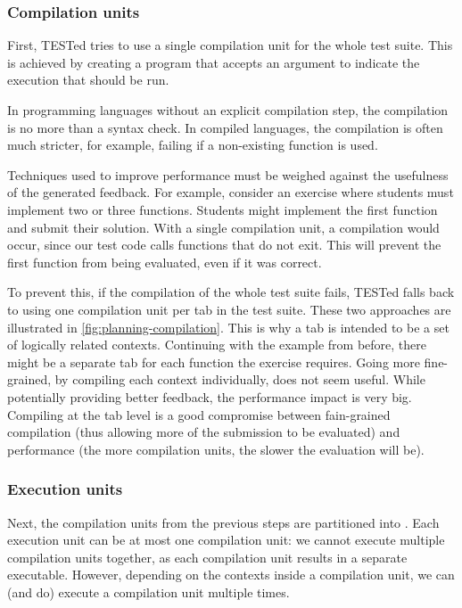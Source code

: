 \documentclass[../main]{subfiles}
\begin{document}
\subsubsection{Compilation units}
\label{subsubsec:compilation-units}

First, TESTed tries to use a single compilation unit for the whole test suite.
This is achieved by creating a program that accepts an argument to indicate the execution that should be run.

In programming languages without an explicit compilation step, the compilation is no more than a syntax check.
In compiled languages, the compilation is often much stricter, for example, failing if a non-existing function is used.

Techniques used to improve performance must be weighed against the usefulness of the generated feedback.
For example, consider an exercise where students must implement two or three functions.
Students might implement the first function and submit their solution.
With a single compilation unit, a compilation would occur, since our test code calls functions that do not exit.
This will prevent the first function from being evaluated, even if it was correct.

To prevent this, if the compilation of the whole test suite fails, TESTed falls back to using one compilation unit per tab in the test suite.
These two approaches are illustrated in \cref{fig:planning-compilation}.
This is why a tab is intended to be a set of logically related contexts.
Continuing with the example from before, there might be a separate tab for each function the exercise requires.
Going more fine-grained, by compiling each context individually, does not seem useful.
While potentially providing better feedback, the performance impact is very big.
Compiling at the tab level is a good compromise between fain-grained compilation (thus allowing more of the submission to be evaluated) and performance (the more compilation units, the slower the evaluation will be).

\subsubsection{Execution units}

Next, the compilation units from the previous steps are partitioned into .
Each execution unit can be at most one compilation unit: we cannot execute multiple compilation units together,
as each compilation unit results in a separate executable.
However, depending on the contexts inside a compilation unit, we can (and do) execute a compilation unit multiple times.
\end{document}

